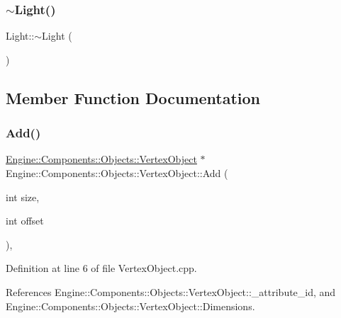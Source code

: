 \subsubsection{\texorpdfstring{$\sim$\+Light()}{~Light()}}
{\footnotesize\ttfamily Light\+::$\sim$\+Light (\begin{DoxyParamCaption}{ }\end{DoxyParamCaption})}



\subsection{Member Function Documentation}
\mbox{\label{classEngine_1_1Components_1_1Objects_1_1VertexObject_a18550cae56ca1066792528a7dcf5d28a}} 
\subsubsection{\texorpdfstring{Add()}{Add()}}
{\footnotesize\ttfamily \mbox{\hyperlink{classEngine_1_1Components_1_1Objects_1_1VertexObject}{Engine\+::\+Components\+::\+Objects\+::\+Vertex\+Object}} $\ast$ Engine\+::\+Components\+::\+Objects\+::\+Vertex\+Object\+::\+Add (\begin{DoxyParamCaption}\item[{int}]{size,  }\item[{int}]{offset }\end{DoxyParamCaption})\hspace{0.3cm}{\ttfamily [protected]}, {\ttfamily [inherited]}}



Definition at line 6 of file Vertex\+Object.\+cpp.



References Engine\+::\+Components\+::\+Objects\+::\+Vertex\+Object\+::\+\_\+attribute\+\_\+id, and Engine\+::\+Components\+::\+Objects\+::\+Vertex\+Object\+::\+Dimensions.


